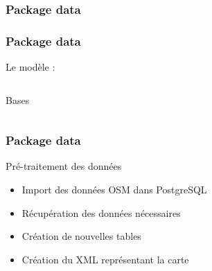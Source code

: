 \documentclass{beamer}
\begin{document}
\subsubsection{Package data}
\begin{frame}
\frametitle{Package data}

Le modèle :\\
\begin{columns}
\begin{column}{.49\textwidth}
\begin{block}{Bases}
\begin{itemize}
\end{itemize}
\end{block}
\end{column}
\begin{column}{.49\textwidth}
\end{column}
\end{columns}
\end{frame}

\begin{frame}
\frametitle{Package data}
\begin{block}{Pré-traitement des données}
\begin{itemize}
\item Import des données OSM dans PostgreSQL
\item Récupération des données nécessaires
\item Création de nouvelles tables
\item Création du XML représentant la carte
\end{itemize}
\end{block}
\end{frame}
\end{document}
